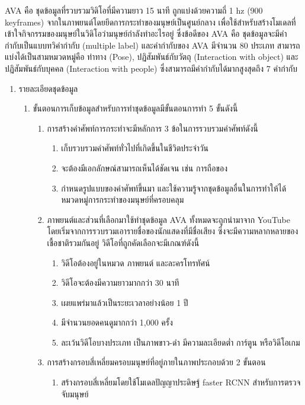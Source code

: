 AVA\textsuperscript{\cite{AVA}} คือ ชุดข้อมูลที่รวบรวมวิดิโอที่มีความยาว 15 นาที ถูกแบ่งด้วยความถี่ 1 hz (900 keyframes) จากในภาพยนต์โดยยึดการกระทำของมนุษย์เป็นศูนย์กลาง
เพื่อใช้สำหรับสร้างโมเดลที่เข้าใจกิจกรรมของมนุษย์ในวิดิโอว่ามนุษย์กำลังทำอะไรอยู่ ซึ่งข้อดีของ AVA คือ ชุดข้อมูลจะมีคำกำกับเป็นแบบทวิคำกำกับ (multiple label)
และคำกำกับของ AVA มีจำนวน 80 ประเภท สามารถแบ่งได้เป็นสามหมวดหมู่คือ ท่าทาง (Pose), ปฏิสัมพันธ์กับวัตถุ (Interaction with object) 
และปฏิสัมพันธ์กับบุคคล (Interaction with people) ซึ่งสามารถมีคำกำกับได้มากสูงสุดถึง 7 คำกำกับ
\begin{enumerate}
	\item {รายละเอียดชุดข้อมูล}
	\begin{enumerate}
		\item ขั้นตอนการเก็บข้อมูลสำหรับการทำชุดข้อมูลมีขั้นตอนการทำ 5 ขั้นดังนี้
		\begin{enumerate}
			\item การสร้างคำศัพท์การกระทำจะมีหลักการ 3 ข้อในการรวบรวมคำศัพท์ดังนี้
			\begin{enumerate}
				\item เก็บรวบรวมคำศัพท์ทั่วไปที่เกิดขึ้นในชีวิตประจำวัน
				\item จะต้องมีเอกลักษณ์สามารถเห็นได้ชัดเจน เช่น การถือของ
				\item กำหนดรูปแบบของคำศัพท์ขึ้นมา และใช้ความรู้จากชุดข้อมูลอื่นในการทำให้ได้หมวดหมู่การกระทำของมนุษย์ที่ครอบคลุม
			\end{enumerate}
			\item ภาพยนต์และส่วนที่เลือกมาใช้ทำชุดข้อมูล AVA ทั้งหมดจะถูกนำมาจาก YouTube โดยเริ่มจากการรวบรวมเอารายชื่อของนักแสดงที่มีชื่อเสียง
			ซึ่งจะมีความหลากหลายของเชื้อชาติรวมกันอยู่ วิดีโอที่ถูกคัดเลือกจะมีเกณฑ์ดังนี้
			\begin{enumerate}
				\item วิดีโอต้องอยู่ในหมวด ภาพยนต์ และละครโทรทัศน์
				\item วิดีโอจะต้องมีความยาวมากกว่า 30 นาที
				\item เผยแพร่มาแล้วเป็นระยะเวลาอย่างน้อย 1 ปี
				\item มีจำนวนยอดคนดูมากกว่า 1,000 ครั้ง
				\item ละเว้นวิดีโอบางประเภท เป็นภาพขาว-ดำ มีความละเอียดต่ำ การ์ตูน หรือวิดีโอเกม
			\end{enumerate}
			\item การสร้างกรอบสี่เหลี่ยมครอบมนุษย์ที่อยู่ภายในภาพประกอบด้วย 2 ขั้นตอน
			\begin{enumerate}
				\item สร้างกรอบสี่เหลี่ยมโดยใช้โมเดลปัญญาประดิษฐ์ faster RCNN สำหรับการตรวจจับมนุษย์

\end{enumerate}
\end{enumerate}
\end{enumerate}
\end{enumerate}
